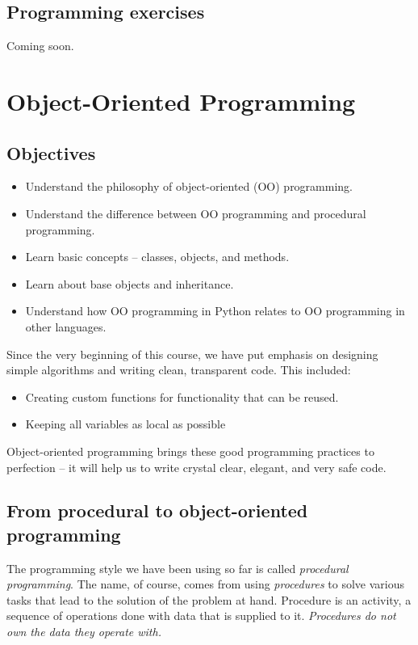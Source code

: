 \subsection{Programming exercises}

Coming soon.

\section{Object-Oriented Programming}

\subsection{Objectives}

\begin{itemize}
\item Understand the philosophy of object-oriented (OO) programming.
\item Understand the difference between OO programming and procedural programming.
\item Learn basic concepts -- classes, objects, and methods.
\item Learn about base objects and inheritance.
\item Understand how OO programming in Python relates to OO programming in other languages.
\end{itemize}
Since the very beginning of this course, 
we have put emphasis on designing simple algorithms
and writing clean, transparent code. This included:
\begin{itemize}
\item Creating custom functions for functionality that can be reused.
\item Keeping all variables as local as possible
\end{itemize}
Object-oriented programming brings these good programming practices to
perfection -- it will help us to write crystal clear, elegant, and very safe code.

\subsection{From procedural to object-oriented programming}

The programming style we have been using so far is called {\em procedural programming}.
The name, of course, comes from using {\em procedures} to solve various tasks that 
lead to the solution of the problem at hand. Procedure is an activity, a sequence of operations 
done with data that is supplied to it. {\em Procedures do not own the data they 
operate with.} 

